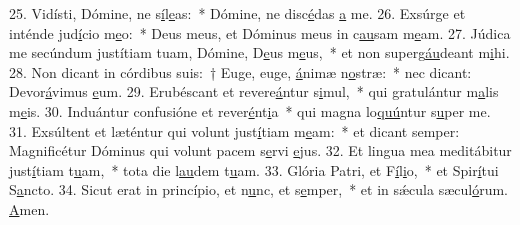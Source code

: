 25. Vidísti, Dómine, ne s\uline{í}l\uline{e}as:~* Dómine, ne disc\uline{é}das \uline{a} me.
26. Exsúrge et inténde jud\uline{í}cio m\uline{e}o:~* Deus meus, et Dóminus meus in c\uline{au}sam m\uline{e}am.
27. Júdica me secúndum justítiam tuam, Dómine, D\uline{e}us m\uline{e}us,~* et non superg\uline{áu}deant m\uline{i}hi.
28. Non dicant in córdibus suis:~† Euge, euge, \uline{á}nimæ n\uline{o}stræ:~* nec dicant: Devor\uline{á}vimus \uline{e}um.
29. Erubéscant et revere\uline{á}ntur s\uline{i}mul,~* qui gratulántur m\uline{a}lis m\uline{e}is.
30. Induántur confusióne et rever\uline{é}nt\uline{i}a~* qui magna lo\uline{quú}ntur s\uline{u}per me.
31. Exsúltent et læténtur qui volunt just\uline{í}tiam m\uline{e}am:~* et dicant semper: Magnificétur Dóminus qui volunt pacem s\uline{e}rvi \uline{e}jus.
32. Et lingua mea meditábitur just\uline{í}tiam t\uline{u}am,~* tota die l\uline{au}dem t\uline{u}am.
33. Glória Patri, et F\uline{í}l\uline{i}o,~* et Spir\uline{í}tui S\uline{a}ncto.
34. Sicut erat in princípio, et n\uline{u}nc, et s\uline{e}mper,~* et in sǽcula sæcul\uline{ó}rum. \uline{A}men.
